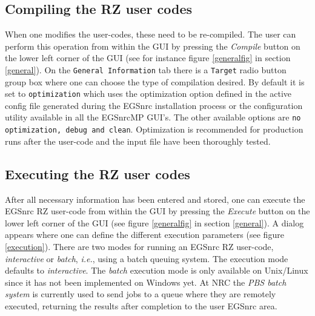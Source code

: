 \documentclass[12pt,twoside]{article}   %
\newcommand{\ie}{{\em i.e.}}
\begin{document}
\subsection{Compiling the RZ user codes}
 
When one modifies the user-codes, these need to be re-compiled. 
The user can perform
this operation from within the GUI by pressing the {\em Compile} button on the  lower left 
corner of the GUI (see for instance figure \ref{generalfig} in section \ref{general}). 
On the {\tt General Information} tab there is a {\tt Target} radio button group box where
one can choose the type of compilation desired. By default it is set to {\tt optimization}
which uses the optimization option defined in the active config file generated during the 
EGSnrc installation process or the configuration utility available in all the EGSnrcMP GUI's.
The other available options are {\tt no optimization, debug and clean}.
Optimization is recommended for production runs after the user-code
and the input file have been thoroughly tested.

\subsection{Executing the RZ user codes}

After all necessary information has been entered and stored, one can execute the EGSnrc 
RZ user-code from within the GUI by pressing the {\em Execute} button on the  lower left 
corner of the GUI (see figure \ref{generalfig} in section \ref{general}). A dialog appears 
where one can define the different execution parameters (see figure \ref{execution}). 
There are two modes for running an EGSnrc RZ user-code, {\it interactive} or {\it batch}, \ie, 
using a batch queuing system. The execution mode defaults to {\it interactive}. 
The {\it batch} execution mode is only available on Unix/Linux since it has not 
been implemented on Windows yet.
At NRC the {\em PBS batch system} is currently used to send jobs to a queue where 
they are remotely executed, returning the results after completion to the 
user EGSnrc area.
 
\end{document}
